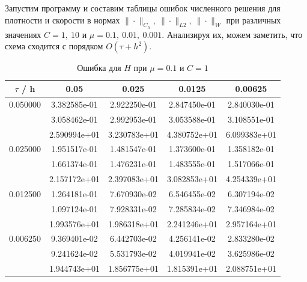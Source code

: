 \documentclass[specialist,subf,href,colorlinks=true,12pt
,times,mtpro,specialist
]{disser}
\begin{document}
Запустим программу и составим таблицы ошибок численного решения для плотности и скорости в нормах $\|\cdot \|_{C_h},\ \| \cdot \|_{L2},\ \| \cdot \|_W$ при различных значениях $C = 1,\ 10$ и $\mu = 0.1,\ 0.01,\ 0.001$. Анализируя их, можем заметить, что схема сходится с порядком $O(\tau + h^2)$. 

\begin{table}[H]
\small
\caption{Ошибка для $H$ при $\mu=0.1$ и $C = 1$}
\begin{center}
\begin{tabular}{|c|c|c|c|c|}
\hline
$\tau$ / h & 0.05 & 0.025 & 0.0125 & 0.00625 \\
\hline
0.050000 & 3.382585e-01  & 2.922250e-01  & 2.847450e-01  & 2.840030e-01 \\
 & 3.058462e-01  & 2.992953e-01  & 3.053588e-01  & 3.108551e-01 \\
 & 2.590994e+01  & 3.230783e+01  & 4.380752e+01  & 6.099383e+01 \\
\hline
0.025000 & 1.951517e-01  & 1.481547e-01  & 1.373600e-01  & 1.358182e-01 \\
 & 1.661374e-01  & 1.476231e-01  & 1.483555e-01  & 1.517066e-01 \\
 & 2.157172e+01  & 2.397083e+01  & 3.082853e+01  & 4.254339e+01 \\
\hline
0.012500 & 1.264181e-01  & 7.670930e-02  & 6.546455e-02  & 6.307194e-02 \\
 & 1.097124e-01  & 7.928331e-02  & 7.285834e-02  & 7.346984e-02 \\
 & 1.993576e+01  & 1.986318e+01  & 2.241246e+01  & 2.957164e+01 \\
\hline
0.006250 & 9.369401e-02  & 6.442703e-02  & 4.256141e-02  & 2.833280e-02 \\
 & 9.241624e-02  & 5.531793e-02  & 4.019941e-02  & 3.625986e-02 \\
 & 1.944743e+01  & 1.856775e+01  & 1.815391e+01  & 2.088751e+01 \\
\hline
\end{tabular}
\end{center}
\end{table}
\end{document}
